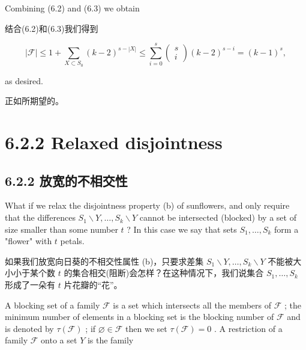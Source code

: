 \documentclass[10pt]{article}
\begin{document}
Combining (6.2) and (6.3) we obtain

\begin{tcolorbox}\relax
结合(6.2)和(6.3)我们得到
\end{tcolorbox}

\[
\left| \mathcal{F}\right|  \leq  1 + \mathop{\sum }\limits_{{X \subset  {S}_{0}}}{\left( k - 2\right) }^{s - \left| X\right| } \leq  \mathop{\sum }\limits_{{i = 0}}^{s}\left( \begin{matrix} s \\  i \end{matrix}\right) {\left( k - 2\right) }^{s - i} = {\left( k - 1\right) }^{s},
\]

as desired.

\begin{tcolorbox}\relax
正如所期望的。
\end{tcolorbox}

\section*{6.2.2 Relaxed disjointness}

\begin{tcolorbox}\relax
\section*{6.2.2 放宽的不相交性}
\end{tcolorbox}

What if we relax the disjointness property (b) of sunflowers, and only require that the differences \({S}_{1} \smallsetminus  Y,\ldots ,{S}_{k} \smallsetminus  Y\) cannot be intersected (blocked) by a set of size smaller than some number \(t\) ? In this case we say that sets \({S}_{1},\ldots ,{S}_{k}\) form a "flower" with \(t\) petals.

\begin{tcolorbox}\relax
如果我们放宽向日葵的不相交性属性 (b)，只要求差集 \({S}_{1} \smallsetminus  Y,\ldots ,{S}_{k} \smallsetminus  Y\) 不能被大小小于某个数 \(t\) 的集合相交(阻断)会怎样？在这种情况下，我们说集合 \({S}_{1},\ldots ,{S}_{k}\) 形成了一朵有 \(t\) 片花瓣的“花”。
\end{tcolorbox}

A blocking set of a family \(\mathcal{F}\) is a set which intersects all the members of \(\mathcal{F}\) ; the minimum number of elements in a blocking set is the blocking number of \(\mathcal{F}\) and is denoted by \(\tau \left( \mathcal{F}\right)\) ; if \(\varnothing  \in  \mathcal{F}\) then we set \(\tau \left( \mathcal{F}\right)  = 0\) . A restriction of a family \(\mathcal{F}\) onto a set \(Y\) is the family
\end{document}
